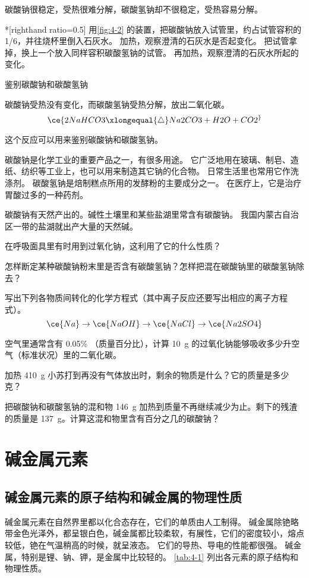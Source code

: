 碳酸钠很稳定，受热很难分解，碳酸氢钠却不很稳定，受热容易分解。
\begin{Experiment}*[righthand ratio=0.5]
用\cref{fig:4-2} 的装置，把碳酸钠放入试管里，约占试管容积的 1/6，并往烧杯里倒入石灰水。
加热，观察澄清的石灰水是否起变化。
把试管拿掉，换上一个放入同样容积碳酸氢钠的试管。
再加热，观察澄清的石灰水所起的变化。
\tcblower
\begin{figurehere}
  \caption{鉴别碳酸钠和碳酸氢钠}\label{fig:4-2}
\end{figurehere}
\end{Experiment}
碳酸钠受热没有变化，而碳酸氢钠受热分解，放出二氧化碳。
\[ \ce{ 2NaHCO3 \xlongequal{\triangle} Na2CO3 + H2O + CO2 ^} \]

这个反应可以用来鉴别碳酸钠和碳酸氢钠。

碳酸钠是化学工业的重要产品之一，有很多用途。
它广泛地用在玻璃、制皂、造纸、纺织等工业上，也可以用来制造其它钠的化合物。
日常生活里也常用它作洗涤剂。
碳酸氢钠是焙制糕点所用的发酵粉的主要成分之一。
在医疗上，它是治疗胃酸过多的一种药剂。

碳酸钠有天然产出的。碱性土壤里和某些盐湖里常含有碳酸钠。
我国内蒙古自治区一带的盐湖就出产大量的天然碱。
\begin{Practice}[习题]
  \begin{question}
    \item 在呼吸面具里有时用到过氧化钠，这利用了它的什么性质？
    \item 怎样断定某种碳酸钠粉末里是否含有碳酸氢钠？怎样把混在碳酸钠里的碳酸氢钠除去？
    \item 写出下列各物质间转化的化学方程式（其中离子反应还要写出相应的离子方程式）。
    \[ \ce{Na} \to \ce{NaOH} \to \ce{NaCl} \to \ce{Na2SO4}\]
    \item 空气里通常含有 0.05\% （质量百分比），计算 \qty{10}{g} 的过氧化钠能够吸收多少升空气（标准状况）里的二氧化碳。
    \item 加热 \qty{410}{g} 小苏打到再没有气体放出时，剩余的物质是什么？它的质量是多少克？
    \item 把碳酸钠和碳酸氢钠的混和物 \qty{146}{g} 加热到质量不再继续减少为止。剩下的残渣的质量是 \qty{137}{g}。计算这混和物里含有百分之几的碳酸钠？
  \end{question}
\end{Practice}

\section{碱金属元素}
\subsection{碱金属元素的原子结构和碱金属的物理性质}
碱金属元素在自然界里都以化合态存在，它们的单质由人工制得。
碱金属除铯略带金色光泽外，都呈银白色，碱金属都比较柔软，有展性，它们的密度较小，熔点较低，铯在气温稍高的时候，就呈液态。
它们的导热、导电的性能都很强。
碱金属，特别是锂、钠、钾，是金属中比较轻的。
\cref{tab:4-1} 列出各元素的原子结构和物理性质。

